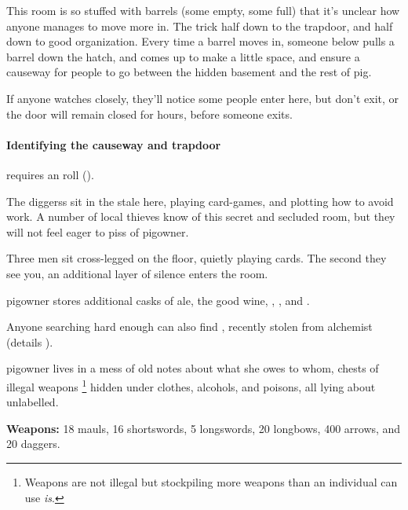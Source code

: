 \begin{multicols}{2}

This room is so stuffed with barrels (some empty, some full) that it's unclear how anyone manages to move more in.
The trick half down to the trapdoor, and half down to good organization.
Every time a barrel moves in, someone below pulls a barrel down the hatch, and comes up to make a little space, and ensure a causeway for people to go between the hidden basement and the rest of \gls{pig}.

If anyone watches closely, they'll notice some people enter here, but don't exit, or the door will remain closed for hours, before someone exits.

\paragraph{Identifying the causeway and trapdoor}
requires an  roll (\tn[10]).

The \glspl{diggers} sit in the stale here, playing card-games, and plotting how to avoid work.
A number of local thieves know of this secret and secluded room, but they will not feel eager to piss of \gls{pigowner}.

\begin{boxtext}
  Three men sit cross-legged on the floor, quietly playing cards.
  The second they see you, an additional layer of silence enters the room.
\end{boxtext}



\Gls{pigowner} stores additional casks of ale, the good wine, \rations, \rations, and \rations.

Anyone searching hard enough can also find \lootTalisman, recently stolen from \gls{alchemist} (details ).


\Gls{pigowner} lives in a mess of old notes about what she owes to whom, chests of illegal weapons%
\footnote{Weapons are not illegal but stockpiling more weapons than an individual can use \emph{is}.}
hidden under clothes, alcohols, and poisons, all lying about unlabelled.

\textbf{Weapons:} 18 mauls, 16 shortswords, 5 longswords, 20 longbows, 400 arrows, and 20 daggers.


\end{multicols}
